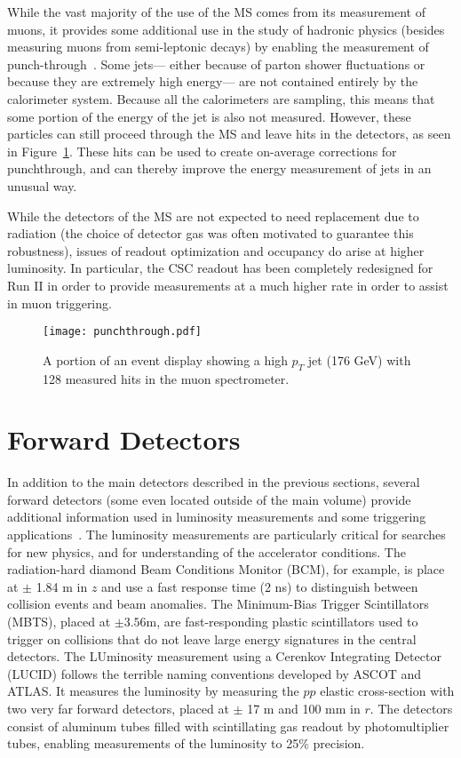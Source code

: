 While the vast majority of the use of the MS comes from its measurement of muons, it provides some additional use in the study of hadronic physics (besides measuring muons from semi-leptonic decays) by enabling the measurement of punch-through~\cite{JES2010}. Some jets--- either because of parton shower fluctuations or because they are extremely high energy--- are not contained entirely by the calorimeter system. Because all the calorimeters are sampling, this means that some portion of the energy of the jet is also not measured. However, these particles can still proceed through the MS and leave hits in the detectors, as seen in Figure~\ref{fig:detector:punchthrough}. These hits can be used to create on-average corrections for punchthrough, and can thereby improve the energy measurement of jets in an unusual way.

While the detectors of the MS are not expected to need replacement due to radiation (the choice of detector gas was often motivated to guarantee this robustness), issues of readout optimization and occupancy do arise at higher luminosity. In particular, the CSC readout has been completely redesigned for Run II in order to provide measurements at a much higher rate in order to assist in muon triggering. 


\begin{figure}
\centering
\texttt{[image: punchthrough.pdf]}
\label{fig:detector:punchthrough}
\caption{A portion of an event display showing a high $p_T$ jet (176 GeV) with 128 measured hits in the muon spectrometer.}
\end{figure}


\section{Forward Detectors}

In addition to the main detectors described in the previous sections, several forward detectors (some even located outside of the main volume) provide additional information used in luminosity measurements and some triggering applications~\cite{ATLASPaper}. The luminosity measurements are particularly critical for searches for new physics, and for understanding of the accelerator conditions. The radiation-hard diamond Beam Conditions Monitor (BCM), for example, is place at $\pm$ 1.84 m in $z$ and use a fast response time (2 ns) to distinguish between collision events and beam anomalies. The Minimum-Bias Trigger Scintillators (MBTS), placed at $\pm 3.56$m, are fast-responding plastic scintillators used to trigger on collisions that do not leave large energy signatures in the central detectors. The LUminosity measurement using a Cerenkov Integrating Detector (LUCID) follows the terrible naming conventions developed by ASCOT and ATLAS. It measures the luminosity by measuring the $pp$ elastic cross-section with two very far forward detectors, placed at $\pm$ 17 m and 100 mm in $r$. The detectors consist of aluminum tubes filled with scintillating gas readout by photomultiplier tubes, enabling measurements of the luminosity to 25$\%$ precision.

